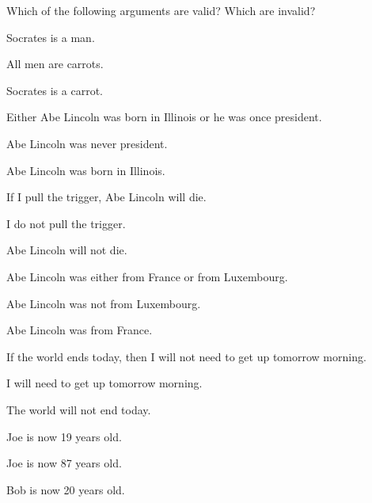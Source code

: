 \practiceproblems
\problempart
Which of the following arguments are valid? Which are invalid?
\begin{compactlist}
\item
\begin{earg}
\item Socrates is a man.
\item All men are carrots.
\item[\texttherefore] Socrates is a carrot.
\end{earg}
\item
\begin{earg}
\item Either Abe Lincoln was born in Illinois or he was once president.
\item Abe Lincoln was never president.
\item[\texttherefore] Abe Lincoln was born in Illinois.
\end{earg}
\item
\begin{earg}
\item If I pull the trigger, Abe Lincoln will die.
\item I do not pull the trigger.
\item[\texttherefore] Abe Lincoln will not die.
\end{earg}
\item
\begin{earg}
\item Abe Lincoln was either from France or from Luxembourg.
\item Abe Lincoln was not from Luxembourg.
\item[\texttherefore] Abe Lincoln was from France.
\end{earg}
\item
\begin{earg}
\item If the world ends today, then I will not need to get up tomorrow morning.
\item I will need to get up tomorrow morning.
\item[\texttherefore] The world will not end today.
\end{earg}
\item
\begin{earg}
\item Joe is now 19 years old.
\item Joe is now 87 years old.
\item[\texttherefore] Bob is now 20 years old.
\end{earg}
\end{compactlist}

